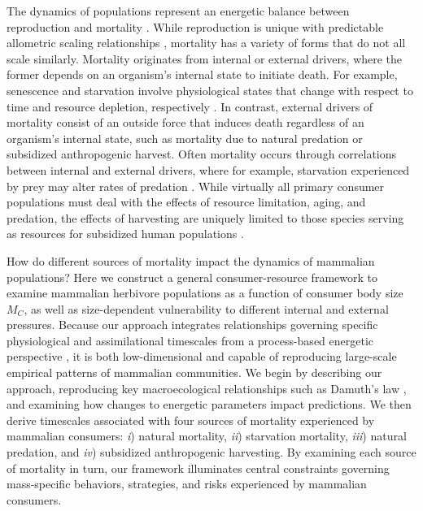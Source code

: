 \documentclass[]{rsos}%
\begin{document}
The dynamics of populations represent an energetic balance between reproduction and mortality \cite{murdoch:2003}.
While reproduction is unique with predictable allometric scaling relationships \cite{CalderIII:1983jd}, mortality has a variety of forms that do not all scale similarly.
Mortality originates from internal or external drivers, where the former depends on an organism's internal state to initiate death.
For example, senescence and starvation involve physiological states that change with respect to time and resource depletion, respectively \cite{yeakel2018dynamics,robert2015actuarial}.
In contrast, external drivers of mortality consist of an outside force that induces death regardless of an organism's internal state, such as mortality due to natural predation or subsidized anthropogenic harvest.
Often mortality occurs through correlations between internal and external drivers, where for example, starvation experienced by prey may alter rates of predation \cite{Alonzo:2002ub}.
While virtually all primary consumer populations must deal with the effects of resource limitation, aging, and predation, the effects of harvesting are uniquely limited to those species serving as resources for subsidized human populations \cite{Dunne:2016jp}.


How do different sources of mortality impact the dynamics of mammalian populations?
Here we construct a general consumer-resource framework to examine mammalian herbivore populations as a function of consumer body size $M_C$, as well as size-dependent vulnerability to different internal and external pressures.
Because our approach integrates relationships governing specific physiological and assimilational timescales from a process-based energetic perspective \cite{West:2001bv}, it is both low-dimensional \cite[cf.][]{yeakel2018dynamics} and capable of reproducing large-scale empirical patterns of mammalian communities.
We begin by describing our approach, reproducing key macroecological relationships such as Damuth's law \cite{Damuth1987}, and examining how changes to energetic parameters impact predictions.
We then derive timescales associated with four sources of mortality experienced by mammalian consumers: \emph{i}) natural mortality, \emph{ii}) starvation mortality, \emph{iii}) natural predation, and \emph{iv}) subsidized anthropogenic harvesting.
By examining each source of mortality in turn, our framework illuminates central constraints governing mass-specific behaviors, strategies, and risks experienced by mammalian consumers.
\end{document}
